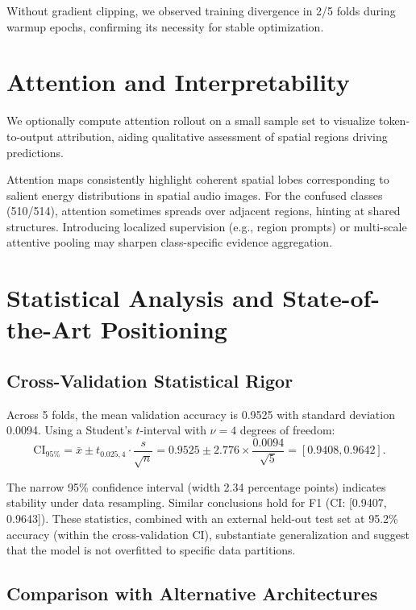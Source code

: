 \documentclass[11pt,a4paper]{article}
\begin{document}
Without gradient clipping, we observed training divergence in 2/5 folds during warmup epochs, confirming its necessity for stable optimization.

\section{Attention and Interpretability}
We optionally compute attention rollout on a small sample set \cite{abnar2020attentionflow} to visualize token-to-output attribution, aiding qualitative assessment of spatial regions driving predictions.

Attention maps consistently highlight coherent spatial lobes corresponding to salient energy distributions in spatial audio images. For the confused classes (510/514), attention sometimes spreads over adjacent regions, hinting at shared structures. Introducing localized supervision (e.g., region prompts) or multi-scale attentive pooling may sharpen class-specific evidence aggregation.

\section{Statistical Analysis and State-of-the-Art Positioning}

\subsection{Cross-Validation Statistical Rigor}

Across 5 folds, the mean validation accuracy is 0.9525 with standard deviation 0.0094. Using a Student's \(t\)-interval with \(\nu=4\) degrees of freedom:
\begin{equation}
\text{CI}_{95\%} = \bar{x} \pm t_{0.025,4} \cdot \frac{s}{\sqrt{n}} = 0.9525 \pm 2.776 \times \frac{0.0094}{\sqrt{5}} = [0.9408, 0.9642].
\end{equation}

The narrow 95\% confidence interval (width 2.34 percentage points) indicates stability under data resampling. Similar conclusions hold for F1 (CI: [0.9407, 0.9643]). These statistics, combined with an external held-out test set at 95.2\% accuracy (within the cross-validation CI), substantiate generalization and suggest that the model is not overfitted to specific data partitions.

\subsection{Comparison with Alternative Architectures}
\end{document}

